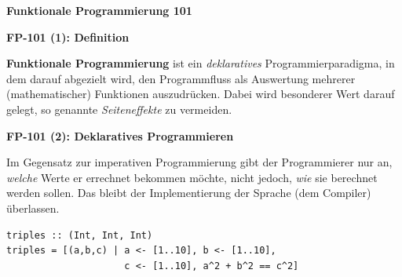 \documentclass{beamer}
\begin{document}
  
  \begin{frame}

    \begin{center}
    \Large\textbf{Funktionale Programmierung 101}
    \end{center}
  \end{frame}
  
  
  \begin{frame}
    \begin{center}
    \Large\textbf{FP-101 (1): Definition}\\ \bigskip \normalsize
    
    \textbf{Funktionale Programmierung} ist ein \emph{deklaratives} Programmierparadigma, in dem darauf abgezielt wird, den Programmfluss als Auswertung mehrerer (mathematischer) Funktionen auszudrücken. Dabei wird besonderer Wert darauf gelegt, so genannte \emph{Seiteneffekte} zu vermeiden.

    \end{center}
  \end{frame}
  
  
\begin{frame}[fragile]
    \begin{center}
    \Large\textbf{FP-101 (2): Deklaratives Programmieren}\\ \bigskip \normalsize    
    \end{center}
    
    Im Gegensatz zur imperativen Programmierung gibt der Programmierer nur an, \emph{welche} Werte er errechnet bekommen möchte, nicht jedoch, \emph{wie} sie berechnet werden sollen. Das bleibt der Implementierung der Sprache (dem Compiler) überlassen. 
    
\begin{verbatim}
triples :: (Int, Int, Int)
triples = [(a,b,c) | a <- [1..10], b <- [1..10], 
                     c <- [1..10], a^2 + b^2 == c^2]
\end{verbatim}
    
\end{frame}

  
\end{document}
